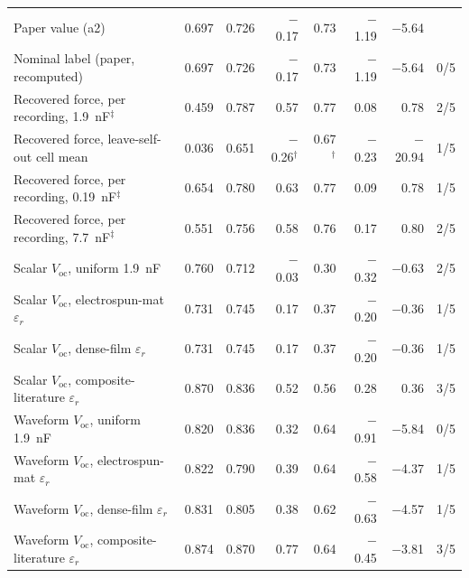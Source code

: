 \begin{tabular}{l rr rr rr r}
Paper value (a2) & 0.697 & 0.726 & $-$0.17 & 0.73 & $-$1.19 & $-$5.64 & \\
Nominal label (paper, recomputed) & 0.697 & 0.726 & $-$0.17 & 0.73 & $-$1.19 & $-$5.64 & 0/5 \\
Recovered force, per recording, \SI{1.9}{\nano\farad}$^\ddagger$ & 0.459 & 0.787 & 0.57 & 0.77 & 0.08 & 0.78 & 2/5 \\
Recovered force, leave-self-out cell mean & 0.036 & 0.651 & $-$0.26$^\dagger$ & 0.67$^\dagger$ & $-$0.23 & $-$20.94 & 1/5 \\
Recovered force, per recording, \SI{0.19}{\nano\farad}$^\ddagger$ & 0.654 & 0.780 & 0.63 & 0.77 & 0.09 & 0.78 & 1/5 \\
Recovered force, per recording, \SI{7.7}{\nano\farad}$^\ddagger$ & 0.551 & 0.756 & 0.58 & 0.76 & 0.17 & 0.80 & 2/5 \\
Scalar $V_\mathrm{oc}$, uniform \SI{1.9}{\nano\farad} & 0.760 & 0.712 & $-$0.03 & 0.30 & $-$0.32 & $-$0.63 & 2/5 \\
Scalar $V_\mathrm{oc}$, electrospun-mat $\varepsilon_r$ & 0.731 & 0.745 & 0.17 & 0.37 & $-$0.20 & $-$0.36 & 1/5 \\
Scalar $V_\mathrm{oc}$, dense-film $\varepsilon_r$ & 0.731 & 0.745 & 0.17 & 0.37 & $-$0.20 & $-$0.36 & 1/5 \\
Scalar $V_\mathrm{oc}$, composite-literature $\varepsilon_r$ & 0.870 & 0.836 & 0.52 & 0.56 & 0.28 & 0.36 & 3/5 \\
Waveform $V_\mathrm{oc}$, uniform \SI{1.9}{\nano\farad} & 0.820 & 0.836 & 0.32 & 0.64 & $-$0.91 & $-$5.84 & 0/5 \\
Waveform $V_\mathrm{oc}$, electrospun-mat $\varepsilon_r$ & 0.822 & 0.790 & 0.39 & 0.64 & $-$0.58 & $-$4.37 & 1/5 \\
Waveform $V_\mathrm{oc}$, dense-film $\varepsilon_r$ & 0.831 & 0.805 & 0.38 & 0.62 & $-$0.63 & $-$4.57 & 1/5 \\
Waveform $V_\mathrm{oc}$, composite-literature $\varepsilon_r$ & 0.874 & 0.870 & 0.77 & 0.64 & $-$0.45 & $-$3.81 & 3/5 \\
\bottomrule
\end{tabular}
